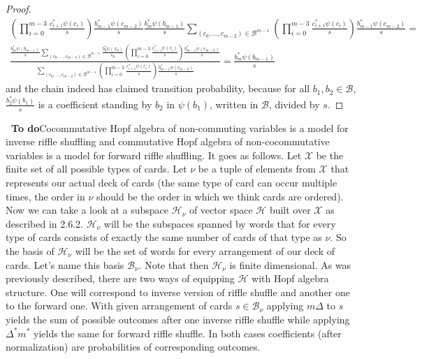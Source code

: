 \documentclass[a4paper, 12pt]{report}
\newcommand{\smalltodo}[1]{\textbf{\ To do}}
\newcommand{\ndotsm}[3]{{#1}_{#2}, \dots, {#1}_{#3}}
\begin{document}
\begin{proof}
\begin{gather*}
{\left(\displaystyle\prod_{i = 0}^{m-3}\frac{c_{i+1}^*\psi(c_i)}{s}\right)\frac{b_{m-1}^*\psi(c_{m-2})}{s}
\frac{b_m^*\psi(b_{m-1})}{s}}{\displaystyle\sum_{(\ndotsm{c}{0}{m-2}) \in \mathcal{B}^{m-1}}
\left(\prod_{i= 0}^{m-3}\frac{c_{i+1}^*
\psi(c_i)}{s}\right)\frac{b_{m-1}^*\psi(c_{m-2})}{s}} = \\[16pt]
\frac{\frac{b_m^*\psi(b_{m-1})}{s}\displaystyle\sum_{(c_0, \dots, c_{m-2}) \in \mathcal{B}^{m-1}}
\frac{b_0^*\psi(x_0)}{s_0}
\left(\displaystyle\prod_{i = 0}^{m-3}\frac{c_{i+1}^*\psi(c_i)}{s}\right)\frac{b_{m-1}^*\psi(c_{m-2})}{s}}
{\displaystyle\sum_{(\ndotsm{c}{0}{m-2}) \in \mathcal{B}^{m-1}}\left(\prod_{i= 0}^{m-3}\frac{c_{i+1}^*
\psi(c_i)}{s}\right)\frac{b_{m-1}^*\psi(c_{m-2})}{s}} = \frac{b_m^*\psi(b_{m-1})}{s}
\end{gather*}
and the chain indeed has claimed transition probability, because for all $b_1, b_2 \in \mathcal{B}$,
 $\frac{b_2^*\psi(b_1)}{s}$ is a coefficient
standing by $b_2$ in $\psi(b_1)$, written in $\mathcal{B}$, divided by $s$.
\end{proof}
\smalltodo\
Cocommutative Hopf algebra of non-commuting variables is a model for inverse riffle shuffling and commutative
Hopf algebra of non-cocommutative variables is a model for forward riffle shuffling. It goes as follows.
Let $\mathcal{X}$ be the finite set of all possible types of cards. Let $\nu$ be a tuple of
elements from $\mathcal{X}$ that represents our actual deck of cards (the same type of card can occur
multiple times, the order in $\nu$ should be the order in which we think cards are ordered). Now we can
take a look at a subspace $\mathcal{H}_\nu$ of vector space $\mathcal{H}$ built over $\mathcal{X}$ as
described in 2.6.2. $\mathcal{H}_\nu$ will be the subspaces spanned by words that for every type of cards
consists of exactly the same number of cards of that type as $\nu$. So the basis of $\mathcal{H}_\nu$ will
be the set
of words for every arrangement of our deck of cards. Let's name this basis $\mathcal{B}_\nu$. Note that then
$\mathcal{H}_\nu$ is finite dimensional. As was previously described, there are two ways of equipping
$\mathcal{H}$ with Hopf algebra structure. One will correspond to inverse version of riffle shuffle and
another one to the forward one. With given arrangement of cards $s \in \mathcal{B}_\nu$ applying $m\Delta$ to
$s$ yields the sum of possible outcomes after one inverse riffle shuffle while applying $\Delta^*m^*$
yields the same for forward riffle shuffle. In both cases coefficients (after normalization) are
probabilities of corresponding outcomes. \\[4pt]
\end{document}
